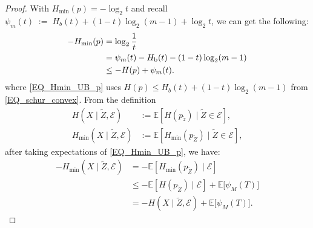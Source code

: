 \documentclass[onecolumn]{IEEEtran} %
\newcommand{\1}{\mathbbm{1}}
\theoremstyle{boldremark}
\begin{document}
\begin{proof}
With \(H_{\min}(p)=-\log_{2}t\) and recall $\psi_m(t) \;:=\; H_b(t) + (1-t)\log_2(m-1) + \log_2 t$, we can get the following:
\begin{align}
  -H_{\min}(p)&=\log_2\frac1t                                             \label{eq:1a}\\
   &=\psi_{m}(t)-H_{\mathrm b}(t)-(1-t)\log_{2}(m-1)                        \notag\\
  &\le -H(p)+\psi_{m}(t). \label{EQ_Hmin_UB_p}
\end{align}
  where  
\eqref{EQ_Hmin_UB_p} uses $H(p)\le H_b(t)+(1-t)\log_2(m-1)$ from \eqref{EQ_schur_convex}.  
From the definition
\begin{align}
  H(X\!\mid  \tilde{Z},\mathcal E)
            &:=\mathds E[H(p_{\tilde{z}})\mid  \tilde{Z}\in\mathcal E],          \\
  H_{\min}(X\!\mid  \tilde{Z},\mathcal E)
            &:=\mathds E[H_{\min}(p_{\tilde{Z}})\mid  \tilde{Z}\in\mathcal E],
\end{align}
after taking expectations of \eqref{EQ_Hmin_UB_p}, we have:
    \begin{align}
    -H_{\min}(X\mid  \tilde{Z},\mathcal E)&=        -\mathds E[H_{\min}(p_{\tilde{Z}})\mid\mathcal E]\\
         &\leq -\mathds E[H(p_{\tilde{Z}})\mid\mathcal E]
              +\mathbb{E}\bigl[\psi_{M}(T)\bigr]\label{eq:2a}\\
     &= -H(X\mid  \tilde{Z},\mathcal E)+\mathbb{E}\bigl[\psi_{M}(T)\bigr].          \label{EQ_Hmin_H}
   \end{align}





\end{proof}
\end{document}
